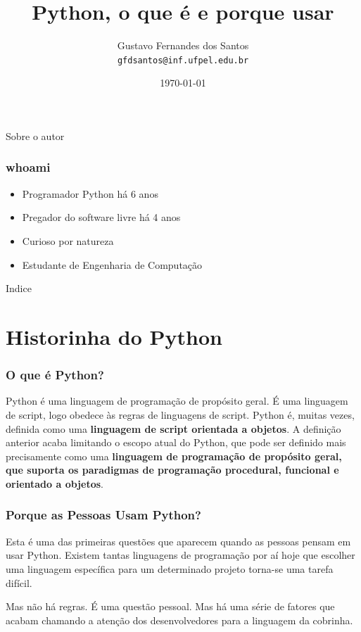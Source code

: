 \documentclass[aspectratio=169]{beamer}
\title{Python, o que é e porque usar}
\author[Gustavo Santos]{Gustavo Fernandes dos Santos \\
\texttt{gfdsantos@inf.ufpel.edu.br}}
\institute{UFPEL - Universidade Federal de Pelotas}
\date{\today}
\begin{document}
\begin{frame}
  \titlepage
\end{frame}

\begin{frame}{Sobre o autor}
    \frametitle{whoami}
    \begin{itemize}
        \item Programador Python há 6 anos
        \item Pregador do software livre há 4 anos
        \item Curioso por natureza
        \item Estudante de Engenharia de Computação
    \end{itemize}
\end{frame}

\begin{frame}{Indice}
    \tableofcontents
\end{frame}


\section{Historinha do Python}

\begin{frame}
    \frametitle{O que é Python?}
    Python é uma linguagem de programação de propósito geral. É uma linguagem de
script, logo obedece às regras de linguagens de script. Python é,
muitas vezes, definida como uma \textbf{linguagem de script orientada a objetos}. A
definição anterior acaba limitando o escopo atual do Python, que pode ser definido
mais precisamente como uma \textbf{linguagem de programação de propósito geral, que
suporta os paradigmas de programação procedural, funcional e orientado a objetos}.
\end{frame}

\begin{frame}
    \frametitle{Porque as Pessoas Usam Python?}
    Esta é uma das primeiras questões que aparecem quando as pessoas pensam em
usar Python. Existem tantas linguagens de programação por aí hoje que escolher uma
linguagem específica para um determinado projeto torna-se uma tarefa difícil.

    Mas não há regras. É uma questão pessoal. Mas há uma série de fatores que
acabam chamando a atenção dos desenvolvedores para a linguagem da cobrinha.
\end{frame}
\end{document}
